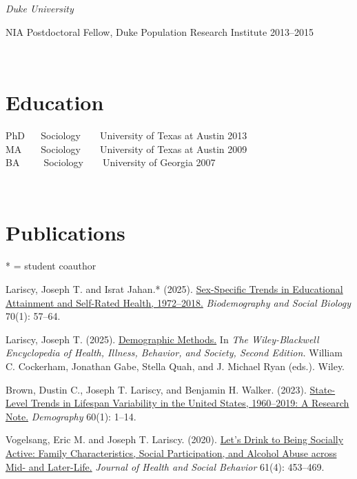 \documentclass[11pt,]{article}
\begin{document}
\setlength{\leftskip}{0cm}

\emph{Duke University}

\setlength{\leftskip}{1cm}

NIA Postdoctoral Fellow, Duke Population Research Institute
\hfill 2013--2015

\setlength{\leftskip}{0cm}

~

\section{Education}\label{education}

PhD ~ ~Sociology ~ ~ University of Texas at Austin \hfill 2013\\
MA ~ ~ Sociology ~ ~ University of Texas at Austin \hfill 2009\\
BA ~ ~ ~Sociology ~ ~ University of Georgia \hfill 2007

~

\section{Publications}\label{publications}

* = student coauthor

Lariscy, Joseph T. and Israt Jahan.* (2025).
\href{https://www.tandfonline.com/doi/full/10.1080/19485565.2024.2448941}{Sex-Specific
Trends in Educational Attainment and Self-Rated Health, 1972--2018.}
\emph{Biodemography and Social Biology} 70(1): 57--64.

Lariscy, Joseph T. (2025).
\href{https://osf.io/preprints/socarxiv/mc6hv/}{Demographic Methods.} In
\emph{The Wiley-Blackwell Encyclopedia of Health, Illness, Behavior, and
Society, Second Edition.} William C. Cockerham, Jonathan Gabe, Stella
Quah, and J. Michael Ryan (eds.). Wiley.

Brown, Dustin C., Joseph T. Lariscy, and Benjamin H. Walker. (2023).
\href{https://read.dukeupress.edu/demography/article/doi/10.1215/00703370-10423884/342894/State-Level-Trends-in-Lifespan-Variability-in-the}{State-Level
Trends in Lifespan Variability in the United States, 1960--2019: A
Research Note.} \emph{Demography} 60(1): 1--14.

Vogelsang, Eric M. and Joseph T. Lariscy. (2020).
\href{https://journals.sagepub.com/doi/full/10.1177/0022146520962456}{Let's
Drink to Being Socially Active: Family Characteristics, Social
Participation, and Alcohol Abuse across Mid- and Later-Life.}
\emph{Journal of Health and Social Behavior} 61(4): 453--469.
\end{document}
